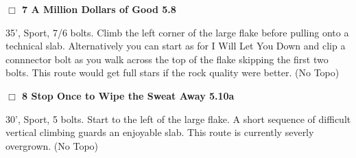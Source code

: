 \begin{multicols}{2}
\needspace{2em}
\label{rt:A Million Dollars of Good}
\colorbox{green!20}{
\parbox{0.95\linewidth}{
\hspace{-1ex}\textbf{$\Box$
7 A Million Dollars of Good 5.8  
}}}
\begin{adjustwidth}{1.3em}{}			

35', Sport, 7/6 bolts. Climb the left corner of the large flake before pulling onto a technical slab. Alternatively you can start as for I Will Let You Down and clip a connnector bolt as you walk across the top of the flake skipping the first two bolts. This route would get full stars if the rock quality were better.
  (No Topo)
\end{adjustwidth}




\needspace{2em}
\label{rt:Stop Once to Wipe the Sweat Away}
\colorbox{RoyalBlue!20}{
\parbox{0.95\linewidth}{
\hspace{-1ex}\textbf{$\Box$
8 Stop Once to Wipe the Sweat Away 5.10a  
}}}
\begin{adjustwidth}{1.3em}{}			

30', Sport, 5 bolts. Start to the left of the large flake. A short sequence of difficult vertical climbing guards an enjoyable slab. This route is currently severly overgrown.
  (No Topo)
\end{adjustwidth}






\end{multicols}
\clearpage